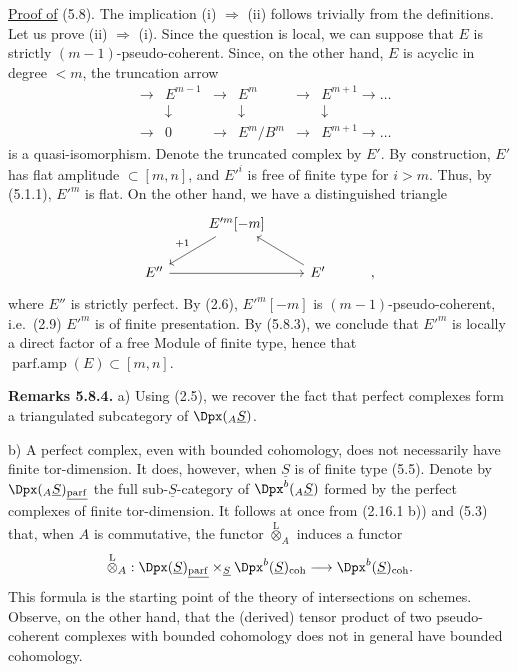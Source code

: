 \uline{Proof of} (5.8). The implication (i) \(\Rightarrow\) (ii) follows trivially from the definitions. Let us prove (ii) \(\Rightarrow\) (i). Since the question is local, we can suppose that \(E\) is strictly \((m-1)\)-pseudo-coherent. Since, on the other hand, \(E\) is acyclic in degree \(<m\), the
%
truncation arrow
\[
\begin{array}{ccccccc}
&\to&E^{m-1}&\to&E^m&\to&E^{m+1}\to\ldots\\
&&\downarrow&&\downarrow&&\downarrow\\
&\to&0&\to&E^m/B^m&\to&E^{m+1}\to\ldots
\end{array}
\]
is a quasi-isomorphism. Denote the truncated complex by \(E'\). By construction, \(E'\) has flat amplitude \(\subset[m,n]\), and \(E'^i\) is free of finite type for \(i>m\). Thus, by (5.1.1), \(E'^m\) is flat. On the other hand, we have a distinguished triangle
\[
\begin{tikzcd}
& E'^m[-m] \arrow[dl,"+1"'] & \\
E'' \arrow[rr] && E' \arrow[ul] & ,
\end{tikzcd}
\]
where \(E''\) is strictly perfect. By (2.6), \(E'^m[-m]\) is \((m-1)\)-pseudo-coherent, i.e.\ (2.9) \(E'^m\) is of finite presentation. By (5.8.3), we conclude that \(E'^m\) is locally a direct factor of a free Module of finite type, hence that \(\operatorname{parf.amp}(E)\subset[m,n]\).

\textbf{Remarks 5.8.4.} a) Using (2.5), we recover the fact that perfect complexes form a triangulated subcategory of \(\Dpx({}_A \underline{S})\).

b) A perfect complex, even with bounded cohomology, does not necessarily have finite tor-dimension. It does, however, when \(\underline{S}\) is of finite type (5.5). Denote by \(\Dpx({}_A \underline{S})_{\underline{\mathrm{parf}}}\) the full sub-\(\underline{S}\)-category of \(\Dpx^b({}_A \underline{S})\) formed by the perfect complexes of finite tor-dimension. It follows at once from (2.16.1 b)) and (5.3) that, when \(A\) is commutative, the functor \(\overset{\mathrm L}{\otimes}_A\) induces a functor
\[
  \overset{\mathrm L}{\otimes}_A:
  \Dpx(\underline{S})_{\underline{\mathrm{parf}}}\times_{\underline{S}} \Dpx^b(\underline{S})_{\mathrm{coh}}
  \longrightarrow \Dpx^b(\underline{S})_{\mathrm{coh}}.
\]
%
This formula is the starting point of the theory of intersections on schemes. Observe, on the other hand, that the (derived) tensor product of two pseudo-coherent complexes with bounded cohomology does not in general have bounded cohomology.

